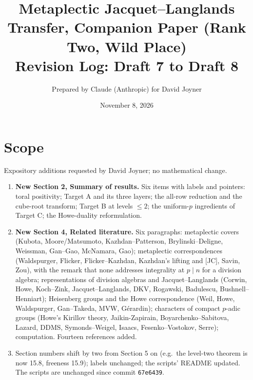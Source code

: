 \documentclass[11pt]{article}
\title{Metaplectic Jacquet--Langlands Transfer, Companion Paper (Rank Two, Wild Place)\\Revision Log: Draft 7 to Draft 8}
\author{Prepared by Claude (Anthropic) for David Joyner}
\date{November 8, 2026}
\begin{document}
\maketitle
\section*{Scope}
Expository additions requested by David Joyner; no mathematical change.
\begin{enumerate}[leftmargin=*]
\item \textbf{New Section 2, Summary of results.}  Six items with labels
and pointers: toral positivity; Target A and its three layers; the
all-row reduction and the cube-root transform; Target B at levels
$\le2$; the uniform-$p$ ingredients of Target C; the Howe-duality
reformulation.
\item \textbf{New Section 4, Related literature.}  Six paragraphs:
metaplectic covers (Kubota, Moore/Matsumoto, Kazhdan--Patterson,
Brylinski--Deligne, Weissman, Gan--Gao, McNamara, Gao); metaplectic
correspondences (Waldspurger, Flicker, Flicker--Kazhdan, Kazhdan's
lifting and [JC], Savin, Zou), with the remark that none addresses
integrality at $p\mid n$ for a division algebra; representations of
division algebras and Jacquet--Langlands (Corwin, Howe, Koch--Zink,
Jacquet--Langlands, DKV, Rogawski, Badulescu, Bushnell--Henniart);
Heisenberg groups and the Howe correspondence (Weil, Howe, Waldspurger,
Gan--Takeda, MVW, G\'erardin); characters of compact $p$-adic groups
(Howe's Kirillov theory, Jaikin-Zapirain, Boyarchenko--Sabitova, Lazard,
DDMS, Symonds--Weigel, Isaacs, Fesenko--Vostokov, Serre); computation.
Fourteen references added.
\item Section numbers shift by two from Section 5 on (e.g.\ the
level-two theorem is now 15.8, freeness 15.9); labels unchanged; the
scripts' README updated.  The scripts are unchanged since commit
\texttt{67e6439}.
\end{enumerate}
\end{document}
